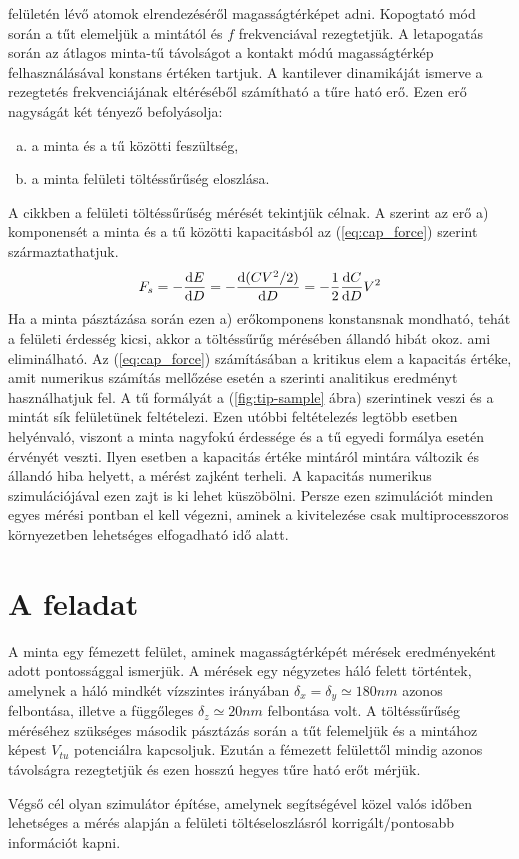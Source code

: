 	felületén lévő atomok elrendezéséről magasságtérképet adni.
	Kopogtató mód \cite{Martin1987} során a tűt elemeljük a mintától és $f$ frekvenciával rezegtetjük.
	A letapogatás során az  átlagos minta-tű távolságot a kontakt módú magasságtérkép felhasználásával
	konstans értéken tartjuk.
	A kantilever dinamikáját ismerve a rezegtetés frekvenciájának eltéréséből
	számítható a tűre ható erő. Ezen erő nagyságát két tényező befolyásolja:
	\begin{enumerate}[a)]
		\item a minta és a tű közötti feszültség,
		\item a minta felületi töltéssűrűség eloszlása.
	\end{enumerate}
	A cikkben a felületi töltéssűrűség mérését tekintjük célnak.
	A \cite{Butt1991Dec, Butt20051} szerint az erő a) komponensét a minta és a tű közötti
	kapacitásból az (\ref{eq:cap_force}) szerint származtathatjuk.
	\begin{equation}
	\label{eq:cap_force}
	F_{s} = -\frac{\ud E}{\ud D} = -\frac{\ud (CV^2 /2)}{\ud D} = -\frac12 \frac{\ud C}{\ud D} V^2
	\end{equation}
	Ha a minta pásztázása során ezen a) erőkomponens konstansnak mondható, tehát a felületi
	érdesség kicsi, akkor a töltéssűrűg mérésében állandó hibát okoz. ami eliminálható.
	Az (\ref{eq:cap_force}) számításában a kritikus elem a kapacitás értéke, amit numerikus számítás
	mellőzése esetén a \cite{Hudlet1998} szerinti analitikus eredményt használhatjuk fel.
	A tű formályát a (\ref{fig:tip-sample} ábra) szerintinek veszi és a mintát sík felületünek
	feltételezi.
	Ezen utóbbi feltételezés legtöbb esetben helyénvaló, viszont a minta nagyfokú érdessége és a
	tű egyedi formálya esetén érvényét veszti. Ilyen esetben a kapacitás értéke mintáról
	mintára változik és állandó hiba helyett, a mérést zajként terheli.
	A kapacitás numerikus szimulációjával ezen zajt is ki lehet küszöbölni.
	Persze ezen szimulációt minden egyes mérési pontban el kell végezni, aminek a kivitelezése
	csak multiprocesszoros környezetben lehetséges elfogadható idő alatt.
	
\section{A feladat} \label{sec:feladat}
	A minta egy fémezett felület, aminek magasságtérképét mérések eredményeként 
	adott pontossággal ismerjük.
	A mérések egy négyzetes háló felett történtek, amelynek a háló mindkét vízszintes irányában
	$\delta_x = \delta_y \simeq 180 nm$ azonos felbontása, illetve a függőleges $\delta_z \simeq 20nm$
	felbontása volt.
	A töltéssűrűség méréséhez szükséges második pásztázás során a tűt felemeljük és a mintához képest
	$V_{tu}$ potenciálra kapcsoljuk. Ezután a fémezett felülettől mindig azonos távolságra rezegtetjük
	és ezen hosszú hegyes tűre ható erőt mérjük.
	\noindent
	\begin{center}
	Végső cél olyan szimulátor építése, amelynek segítségével közel valós időben 
	lehetséges a mérés alapján a felületi töltéseloszlásról korrigált/pontosabb információt
	kapni.
	\end{center}
	
